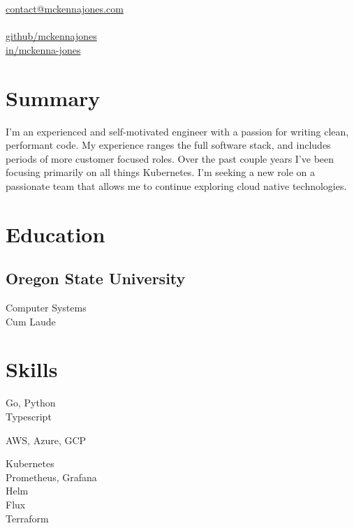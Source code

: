 \documentclass[]{hieudo-build}
\begin{document}
%
%
{
	\faEnvelope \href{mailto:contact@mckennajones.com}{ contact@mckennajones.com}\\
	 \\
	\faGithub \href{https://github.com/mckennajones}{   github/mckennajones}\\
	\faLinkedin \href{https://www.linkedin.com/in/mckenna-jones}{   in/mckenna-jones}}
    
%
%
\begin{minipage}[t]{0.25\textwidth} 

\section{Summary} 
I'm an experienced and self-motivated engineer with a passion for writing clean, performant code. My experience ranges the full software stack, and includes periods of more customer focused roles. Over the past couple years I've been focusing primarily on all things Kubernetes. I'm seeking a new role on a passionate team that allows me to continue exploring cloud native technologies.

\vspace{15pt}
\section{Education} 

\subsection{Oregon State University}
Computer Systems \\
Cum Laude\\

\vspace{15pt}
\section{Skills}
Go, Python\\
Typescript
\sectionsep

AWS, Azure, GCP
\sectionsep

Kubernetes\\
Prometheus, Grafana\\
Helm\\
Flux\\
Terraform 
\sectionsep

%
%
\end{minipage} 
\end{document}
